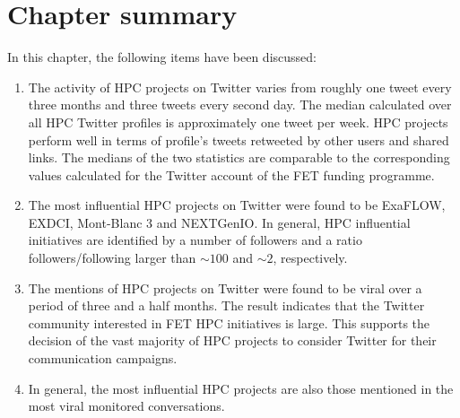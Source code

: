\section{Chapter summary}
In this chapter, the following items have been discussed:

\begin{enumerate}
 \item The activity of HPC projects on Twitter varies from roughly one tweet every three months and three tweets every second day. The median calculated over all HPC Twitter profiles is approximately one tweet per week. HPC projects perform well in terms of profile's tweets retweeted by other users and shared links. The medians of the two statistics are comparable to the corresponding values calculated for the Twitter account of the FET funding programme.
 \item The most influential HPC projects on Twitter were found to be ExaFLOW, EXDCI, Mont-Blanc 3 and NEXTGenIO. In general, HPC influential initiatives are identified by a number of followers and a ratio followers/following larger than $\sim 100$ and $\sim 2$, respectively. 
 \item The mentions of HPC projects on Twitter were found to be viral over a period of three and a half months. The result indicates that the Twitter community interested in FET HPC initiatives is large. This supports the decision of the vast majority of HPC projects to consider Twitter for their communication campaigns.
 \item In general, the most influential HPC projects are also those mentioned in the most viral monitored conversations.    
\end{enumerate}  